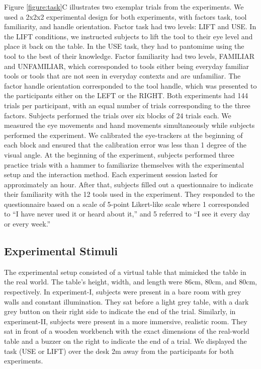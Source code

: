 Figure \ref{figure:task}C  illustrates two exemplar trials from the experiments. We used a 2x2x2 experimental design for both experiments, with factors task, tool familiarity, and handle orientation. Factor task had two levels: LIFT and USE. In the LIFT conditions, we instructed subjects to lift the tool to their eye level and place it back on the table. In the USE task, they had to pantomime using the tool to the best of their knowledge. Factor familiarity had two levels, FAMILIAR and UNFAMILIAR, which corresponded to tools either being everyday familiar tools or tools that are not seen in everyday contexts and are unfamiliar. The factor handle orientation corresponded to the tool handle, which was presented to the participants either on the LEFT or the RIGHT. Both experiments had 144 trials per participant, with an equal number of trials corresponding to the three factors. Subjects performed the trials over six blocks of 24 trials each. 
We measured the eye movements and hand movements simultaneously while subjects performed the experiment. We calibrated the eye-trackers at the beginning of each block and ensured that the calibration error was less than 1 degree of the visual angle. At the beginning of the experiment, subjects performed three practice trials with a hammer to familiarize themselves with the experimental setup and the interaction method. Each experiment session lasted for approximately an hour. After that, subjects filled out a questionnaire to indicate their familiarity with the 12 tools used in the experiment. They responded to the questionnaire based on a scale of 5-point Likert-like scale where 1 corresponded to “I have never used it or heard about it,” and 5 referred to “I see it every day or every week.”

\subsection{Experimental Stimuli}

The experimental setup consisted of a virtual table that mimicked the table in the real world. The table’s height, width, and length were 86cm, 80cm, and 80cm, respectively. In experiment-I, subjects were present in a bare room with grey walls and constant illumination. They sat before a light grey table, with a dark grey button on their right side to indicate the end of the trial. Similarly, in experiment-II, subjects were present in a more immersive, realistic room. They sat in front of a wooden workbench with the exact dimensions of the real-world table and a buzzer on the right to indicate the end of a trial. We displayed the task (USE or LIFT) over the desk 2m away from the participants for both experiments. 

